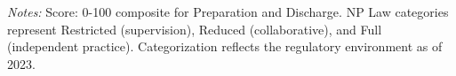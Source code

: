 \begin{table}[htbp]
    \centering
    \caption{Summary of OAS CAHPS: Prep \& Discharge by Authority and Year}
    \label{tab:oas_grp3}
    \vspace{0.2cm}
    \vspace{0.1cm}
    \begin{minipage}{\textwidth}
        \footnotesize \textit{Notes:} Score: 0-100 composite for Preparation and Discharge. NP Law categories represent Restricted (supervision), Reduced (collaborative), and Full (independent practice). Categorization reflects the regulatory environment as of 2023.
    \end{minipage}
\end{table}